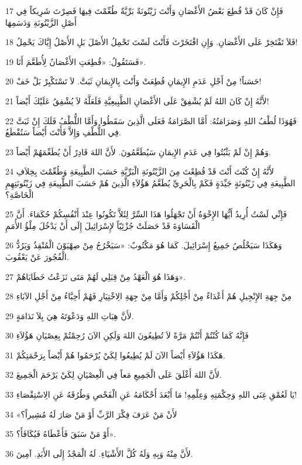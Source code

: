 \par 17 فَإِنْ كَانَ قَدْ قُطِعَ بَعْضُ الأَغْصَانِ وَأَنْتَ زَيْتُونَةٌ بَرِّيَّةٌ طُعِّمْتَ فِيهَا فَصِرْتَ شَرِيكاً فِي أَصْلِ الزَّيْتُونَةِ وَدَسَمِهَا
\par 18 فَلاَ تَفْتَخِرْ عَلَى الأَغْصَانِ. وَإِنِ افْتَخَرْتَ فَأَنْتَ لَسْتَ تَحْمِلُ الأَصْلَ بَلِ الأَصْلُ إِيَّاكَ يَحْمِلُ!
\par 19 فَسَتَقُولُ: «قُطِعَتِ الأَغْصَانُ لِأُطَعَّمَ أَنَا».
\par 20 حَسَناً! مِنْ أَجْلِ عَدَمِ الإِيمَانِ قُطِعَتْ وَأَنْتَ بِالإِيمَانِ ثَبَتَّ. لاَ تَسْتَكْبِرْ بَلْ خَفْ!
\par 21 لأَنَّهُ إِنْ كَانَ اللهُ لَمْ يُشْفِقْ عَلَى الأَغْصَانِ الطَّبِيعِيَّةِ فَلَعَلَّهُ لاَ يُشْفِقُ عَلَيْكَ أَيْضاً!
\par 22 فَهُوَذَا لُطْفُ اللهِ وَصَرَامَتُهُ: أَمَّا الصَّرَامَةُ فَعَلَى الَّذِينَ سَقَطُوا وَأَمَّا اللُّطْفُ فَلَكَ إِنْ ثَبَتَّ فِي اللُّطْفِ وَإِلاَّ فَأَنْتَ أَيْضاً سَتُقْطَعُ.
\par 23 وَهُمْ إِنْ لَمْ يَثْبُتُوا فِي عَدَمِ الإِيمَانِ سَيُطَعَّمُونَ. لأَنَّ اللهَ قَادِرٌ أَنْ يُطَعِّمَهُمْ أَيْضاً.
\par 24 لأَنَّهُ إِنْ كُنْتَ أَنْتَ قَدْ قُطِعْتَ مِنَ الزَّيْتُونَةِ الْبَرِّيَّةِ حَسَبَ الطَّبِيعَةِ وَطُعِّمْتَ بِخِلاَفِ الطَّبِيعَةِ فِي زَيْتُونَةٍ جَيِّدَةٍ فَكَمْ بِالْحَرِيِّ يُطَعَّمُ هَؤُلاَءِ الَّذِينَ هُمْ حَسَبَ الطَّبِيعَةِ فِي زَيْتُونَتِهِمِ الْخَاصَّةِ؟
\par 25 فَإِنِّي لَسْتُ أُرِيدُ أَيُّهَا الإِخْوَةُ أَنْ تَجْهَلُوا هَذَا السِّرَّ لِئَلاَّ تَكُونُوا عِنْدَ أَنْفُسِكُمْ حُكَمَاءَ. أَنَّ الْقَسَاوَةَ قَدْ حَصَلَتْ جُزْئِيّاً لإِسْرَائِيلَ إِلَى أَنْ يَدْخُلَ مِلْؤُ الأُمَمِ
\par 26 وَهَكَذَا سَيَخْلُصُ جَمِيعُ إِسْرَائِيلَ. كَمَا هُوَ مَكْتُوبٌ: «سَيَخْرُجُ مِنْ صِهْيَوْنَ الْمُنْقِذُ وَيَرُدُّ الْفُجُورَ عَنْ يَعْقُوبَ.
\par 27 وَهَذَا هُوَ الْعَهْدُ مِنْ قِبَلِي لَهُمْ مَتَى نَزَعْتُ خَطَايَاهُمْ».
\par 28 مِنْ جِهَةِ الإِنْجِيلِ هُمْ أَعْدَاءٌ مِنْ أَجْلِكُمْ وَأَمَّا مِنْ جِهَةِ الِاخْتِيَارِ فَهُمْ أَحِبَّاءُ مِنْ أَجْلِ الآبَاءِ
\par 29 لأَنَّ هِبَاتِ اللهِ وَدَعْوَتَهُ هِيَ بِلاَ نَدَامَةٍ.
\par 30 فَإِنَّهُ كَمَا كُنْتُمْ أَنْتُمْ مَرَّةً لاَ تُطِيعُونَ اللهَ وَلَكِنِ الآنَ رُحِمْتُمْ بِعِصْيَانِ هَؤُلاَءِ
\par 31 هَكَذَا هَؤُلاَءِ أَيْضاً الآنَ لَمْ يُطِيعُوا لِكَيْ يُرْحَمُوا هُمْ أَيْضاً بِرَحْمَتِكُمْ.
\par 32 لأَنَّ اللهَ أَغْلَقَ عَلَى الْجَمِيعِ مَعاً فِي الْعِصْيَانِ لِكَيْ يَرْحَمَ الْجَمِيعَ.
\par 33 يَا لَعُمْقِ غِنَى اللهِ وَحِكْمَتِهِ وَعِلْمِهِ! مَا أَبْعَدَ أَحْكَامَهُ عَنِ الْفَحْصِ وَطُرُقَهُ عَنِ الِاسْتِقْصَاءِ!
\par 34 «لأَنْ مَنْ عَرَفَ فِكْرَ الرَّبِّ أَوْ مَنْ صَارَ لَهُ مُشِيراً؟
\par 35 أَوْ مَنْ سَبَقَ فَأَعْطَاهُ فَيُكَافَأَ؟».
\par 36 لأَنَّ مِنْهُ وَبِهِ وَلَهُ كُلَّ الأَشْيَاءِ. لَهُ الْمَجْدُ إِلَى الأَبَدِ. آمِينَ.

